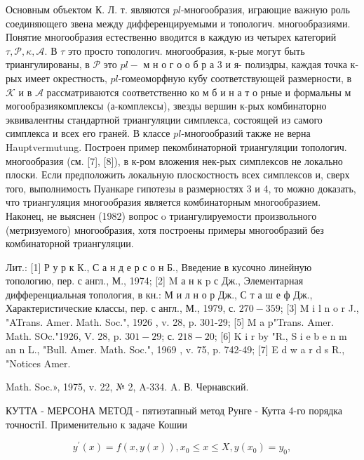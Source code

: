 \documentclass[10pt]{article}
\begin{document}
Основным объектом К. Л. т. являются $p l$-многообразия, играющие важную роль соединяющего звена между дифференцируемыми и топологич. многообразиями. Понятие многообразия естественно вводится в каждую из четырех категорий $\tau, \mathscr{P}, \mathscr{\kappa}, \mathcal{A}$. В $\tau$ это просто топологич. многообразия, к-рые могут быть триангулированы, в $\mathscr{P}$ это $p l-$ м н о г о о б р а 3 и я- полиэдры, каждая точка к-рых имеет окрестность, $p l$-гомеоморфную кубу соответствующей размерности, в $\mathscr{K}$ и в $\mathcal{A}$ рассматриваются соответственно ко м б и н а т о рные и формальны м могообразиякомплексы (а-комплексы), звезды вершин к-рых комбинаторно эквивалентны стандартной триангуляции симплекса, состоящей из самого симплекса и всех его граней. В классе $p l$-многообразий также не верна Hauptvermutung. Построен пример пекомбинаторной триангуляции топологич. многообразия (см. [7], [8]), в к-ром вложения нек-рых симплексов не локально плоски. Если предположить локальную плоскостность всех симплексов и, сверх того, выполнимость Пуанкаре гипотезы в размерностях 3 и 4, то можно доказать, что триангуляция многообразия является комбинаторным многообразием. Наконец, не выяснен (1982) вопрос o триангулируемости произвольного (метризуемого) многообразия, хотя построены примеры многообразий без комбинаторной триангуляции.



Лит.: [1] Р у р к К., С а н д е р с о н Б., Введение в кусочно линейную топологию, пер. с англ., М., 1974; [2] M а н к p с Дж., Элементарная дифференциальная топология, в кн.: М и л н о р Дж., С т а ш е ф Дж., Характеристические классы, пер. с англ., М., 1979, с. $270-359$; [3] M i l n o r J., "ATrans. Amer. Math. Soc.", 1926 , v. 28, p. 301-29; [5] M a p"Trans. Amer. Math. SOc."1926, V. 28, p. $301-29$; с. $218-20$; [6] K i r by "R., S i e b e n m an n L., "Bull. Amer. Math. Soc.", 1969 , v. 75, p. 742-49; [7] E d w a r d s R., "Notices Amer.

Math. Soc.», 1975, v. 22, № 2, A-334. A. В. Чернавский.



КУТТА - МЕРСОНА МЕТОД - пятиэтапный метод Рунге - Кутта 4-го порядка точностіI. Применительно к задаче Кошии



\[

y^{\prime}(x)=f(x, y(x)), x_{0} \leqslant x \leqslant X, y\left(x_{0}\right)=y_{0},

\]
\end{document}
